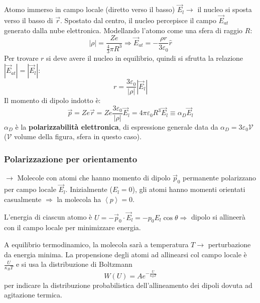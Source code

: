 \documentclass[10pt, a4paper]{scrartcl}
\numberwithin{equation}{subsection}
\theoremstyle{style1}
\begin{document}
Atomo immerso in campo locale (diretto verso il basso) $\vec{E}_l \to$ il nucleo si sposta verso il basso di $\vec{r}$. Spostato dal centro, il nucleo percepisce il campo $\vec{E}_{at} $ generato dalla nube elettronica. Modellando l'atomo come una sfera di raggio $R$:
\begin{equation}
	|\rho| = \frac{Ze}{\frac{4}{3}\pi R^3} \Rightarrow \vec{E}_{at} = -\frac{\rho  r}{3 \varepsilon _0} \hat{r}
\end{equation}
Per trovare $r$ si deve avere il nucleo in equilibrio, quindi si sfrutta la relazione $\left\lvert \vec{E}_{at}  \right\rvert = \left\lvert \vec{E}_l \right\rvert$:
\begin{equation}
	r=\frac{3\varepsilon_0}{|\rho| }\left\lvert \vec{E}_l \right\rvert 
\end{equation}
Il momento di dipolo indotto \`e:
\begin{equation}
	\vec{p}=Ze \vec{r}= Ze \frac{3\varepsilon _0}{|\rho |}\vec{E}_l = 4\pi \varepsilon _0 R^3 \vec{E}_l\equiv \alpha _D \vec{E}_l
\end{equation}
$\alpha _D$ \`e la \textbf{polarizzabilit\`a elettronica}, di espressione generale data da $\alpha _D = 3 \varepsilon _0 \mathcal{V}$ ($\mathcal{V} $ volume della figura, sfera in questo caso).

\subsubsection{Polarizzazione per orientamento}

$\to$ Molecole con atomi che hanno momento di dipolo $\vec{p}_0$ permanente polarizzano per campo locale $\vec{E}_l$. Inizialmente ($E_l = 0$), gli atomi hanno momenti orientati casualmente $\Rightarrow $ la molecola ha $\left\langle p \right\rangle=0$.

L'energia di ciascun atomo \`e $U = - \vec{p}_0 \cdot \vec{E}_l = - p_0E_l \cos \theta \Rightarrow $ dipolo si allineerà con il campo locale per minimizzare energia.

A equilibrio termodinamico, la molecola sar\`a a temperatura $T\to$ perturbazione da energia minima. La propensione degli atomi ad allinearsi col campo locale \`e $\frac{U}{\kappa _B T}$ e si usa la distribuzione di Boltzmann 
\begin{equation}
	W(U) = A e^{-\frac{U}{\kappa _B T}} 
\end{equation}
per indicare la distribuzione probabilistica dell'allineamento dei dipoli dovuta ad agitazione termica.
\end{document}
